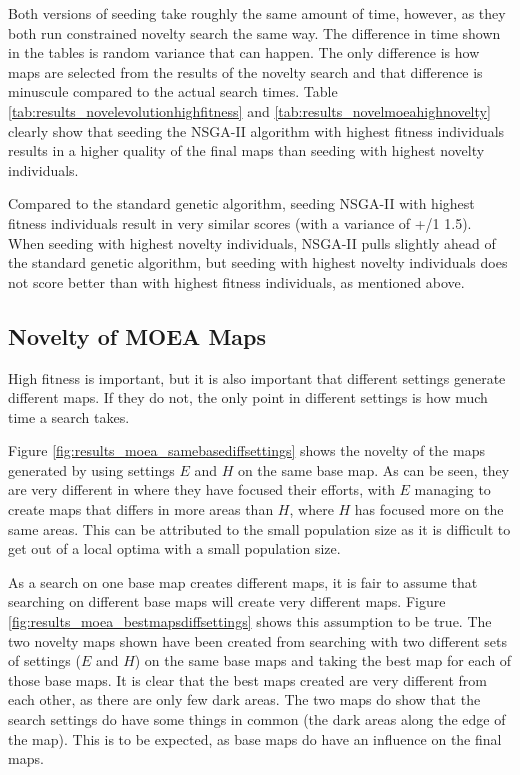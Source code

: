 Both versions of seeding take roughly the same amount of time, however, as they both run constrained novelty search the same way. The difference in time shown in the tables is random variance that can happen. The only difference is how maps are selected from the results of the novelty search and that difference is minuscule compared to the actual search times. Table \ref{tab:results_novelevolutionhighfitness} and \ref{tab:results_novelmoeahighnovelty} clearly show that seeding the NSGA-II algorithm with highest fitness individuals results in a higher quality of the final maps than seeding with highest novelty individuals.

Compared to the standard genetic algorithm, seeding NSGA-II with highest fitness individuals result in very similar scores (with a variance of +/1 1.5). When seeding with highest novelty individuals, NSGA-II pulls slightly ahead of the standard genetic algorithm, but seeding with highest novelty individuals does not score better than with highest fitness individuals, as mentioned above.

\subsection*{Novelty of MOEA Maps}

High fitness is important, but it is also important that different settings generate different maps. If they do not, the only point in different settings is how much time a search takes.


Figure \ref{fig:results_moea_samebasediffsettings} shows the novelty of the maps generated by using settings $E$ and $H$ on the same base map. As can be seen, they are very different in where they have focused their efforts, with $E$ managing to create maps that differs in more areas than $H$, where $H$ has focused more on the same areas. This can be attributed to the small population size as it is difficult to get out of a local optima with a small population size.


As a search on one base map creates different maps, it is fair to assume that searching on different base maps will create very different maps. Figure \ref{fig:results_moea_bestmapsdiffsettings} shows this assumption to be true. The two novelty maps shown have been created from searching with two different sets of settings ($E$ and $H$) on the same base maps and taking the best map for each of those base maps. It is clear that the best maps created are very different from each other, as there are only few dark areas. The two maps do show that the search settings do have some things in common (the dark areas along the edge of the map). This is to be expected, as base maps do have an influence on the final maps.